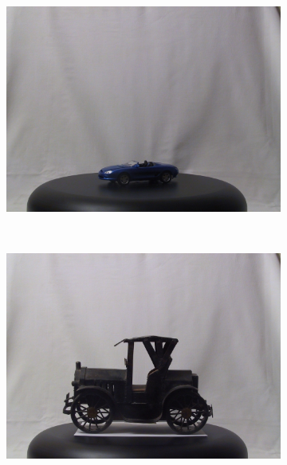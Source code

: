 \documentclass[review]{elsarticle}
\begin{document}
\begin{figure}[htb]
\begin{subfigure}[t]{0.15\columnwidth}
    \end{subfigure}%
    ~ %
    \begin{subfigure}[t]{0.15\columnwidth}
        \centering
        \includegraphics[width=1\columnwidth]{images/3d/3}
    \end{subfigure}%
    ~ %
    \begin{subfigure}[t]{0.15\columnwidth}
        \centering
        \includegraphics[width=1\columnwidth]{images/3d/4}
    \end{subfigure}%
    ~ %
    \begin{subfigure}[t]{0.15\columnwidth}
        \centering

\end{subfigure}
\end{figure}
\end{document}
